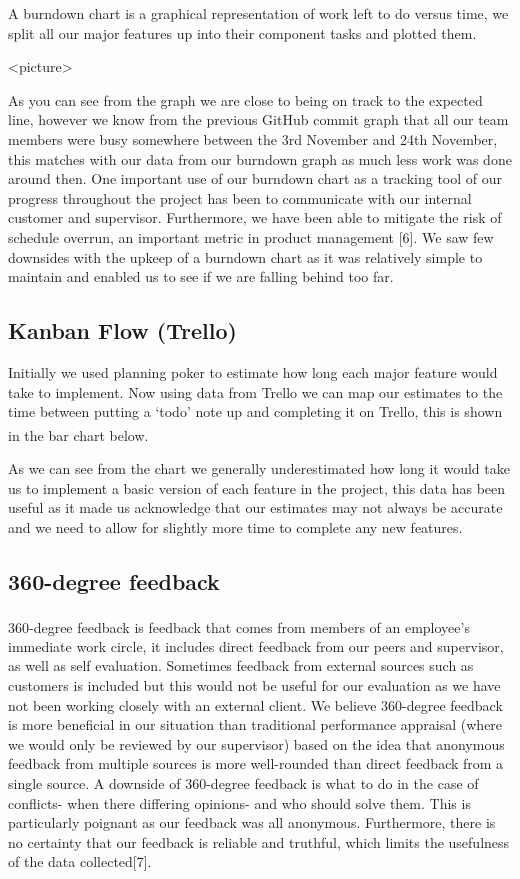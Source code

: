 \documentclass[10pt, a4paper]{article}
\begin{document}
A burndown chart is a graphical representation of work left to do versus time, we split all our major features up into their component tasks and plotted them.

<picture>

As you can see from the graph we are close to being on track to the expected line, however we know from the previous GitHub commit graph that all our team members were busy somewhere between the 3rd November and 24th November, this matches with our data from our burndown graph as much less work was done around then. One important use of our burndown chart as a tracking tool of our progress throughout the project has been to communicate with our internal customer and supervisor. Furthermore, we have been able to mitigate the risk of schedule overrun, an  important metric in product management [6]. We saw few downsides with the upkeep of a burndown chart as it was relatively simple to maintain and enabled us to see if we are falling behind too far. 

\subsection{Kanban Flow (Trello)}

Initially we used  planning poker to estimate how long each major feature would take to implement. Now using data from Trello we can map our estimates to the time between putting a ‘todo’ note up and completing it on Trello, this is shown in the bar chart below\textsuperscript{\cite{kan}}.

As we can see from the chart we generally underestimated how long it would take us to implement a basic version of each feature in the project, this data has been useful as it made us acknowledge that our estimates may not always be accurate and we need to allow for slightly more time to complete any new features.

\subsection{360-degree feedback}

360-degree feedback\textsuperscript{\cite{jj}} is feedback that comes from members of an employee's immediate work circle, it includes direct feedback from our peers and supervisor, as well as self evaluation. Sometimes feedback from external sources such as customers is included but this would not be useful for our evaluation as we have not been working closely with an external client. We believe 360-degree feedback is more beneficial in our situation than traditional performance appraisal (where we would only be reviewed by our supervisor) based on the idea that anonymous feedback from multiple sources is more well-rounded than direct feedback from a single source. A downside of 360-degree feedback is what to do in the case of conflicts- when there differing opinions- and who should solve them. This is particularly poignant as our feedback was all anonymous. Furthermore, there is no certainty that our feedback is reliable and truthful, which limits the usefulness of the data collected[7].
\end{document}
